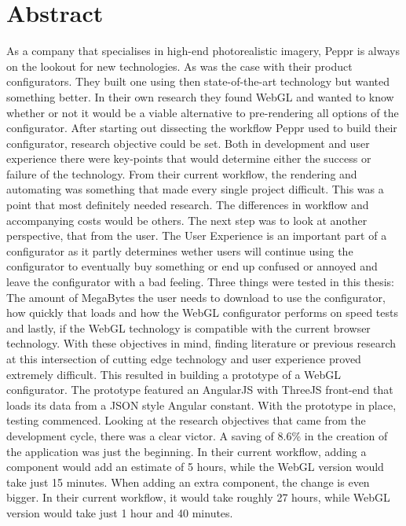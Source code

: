 \chapter*{Abstract}%

As a company that specialises in high-end photorealistic imagery, Peppr is always on the lookout for new technologies. As was the case with their product configurators. They built one using then state-of-the-art technology but wanted something better. In their own research they found WebGL and wanted to know whether or not it would be a viable alternative to pre-rendering all options of the configurator. \newline
After starting out dissecting the workflow Peppr used to build their configurator, research objective could be set. Both in development and user experience there were key-points that would determine either the success or failure of the technology. From their current workflow, the rendering and automating was something that made every single project difficult. This was a point that most definitely needed research. The differences in workflow and accompanying costs would be others.\newline
The next step was to look at another perspective, that from the user. The User Experience is an important part of a configurator as it partly determines wether users will continue using the configurator to eventually buy something or end up confused or annoyed and leave the configurator with a bad feeling. Three things were tested in this thesis: The amount of MegaBytes the user needs to download to use the configurator, how quickly that loads and how the WebGL configurator performs on speed tests and lastly, if the WebGL technology is compatible with the current browser technology. \newline
With these objectives in mind, finding literature or previous research at this intersection of cutting edge technology and user experience proved extremely difficult. This resulted in building a prototype of a WebGL configurator. The prototype featured an AngularJS with ThreeJS front-end that loads its data from a JSON style Angular constant. With the prototype in place, testing commenced. \newline
Looking at the research objectives that came from the development cycle, there was a clear victor. A saving of 8.6\% in the creation of the application was just the beginning. In their current workflow, adding a component would add an estimate of 5 hours, while the WebGL version would take just 15 minutes. When adding an extra component, the change is even bigger. In their current workflow, it would take roughly 27 hours, while WebGL version would take just 1 hour and 40 minutes. \newline
